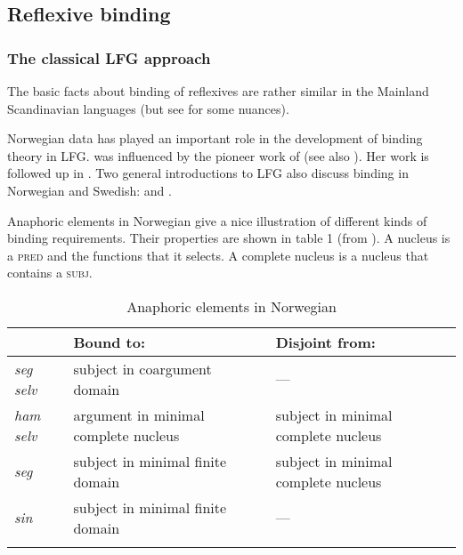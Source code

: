 \documentclass[output=paper,hidelinks]{langscibook}
\begin{document}
\ea\label{ex:Scandinavian:105}
\z


\ea\label{ex:Scandinavian:106}
 \z

 \subsection{Reflexive binding}
 \label{sec:Scandinavian:3.11}

\subsubsection{The classical LFG approach}

The basic facts about binding of reflexives are rather similar in the Mainland Scandinavian languages (but see \citealt{Lundquist14} for some nuances).

 Norwegian data has played an important role in the development of binding theory in LFG. \citet{dalrymple1993} was influenced by the pioneer work of \citet{Hellan88} (see also \citealt{Hestvik91}). Her work is followed up in \citet[227--85]{BresnanEtAl2016}. Two general introductions to LFG also discuss binding in Norwegian and Swedish: \citet[173--91]{falk2001lexical} and \citet[152--175]{BoNoSa19}.

 Anaphoric elements in Norwegian give a nice illustration of different kinds of binding requirements. Their properties are shown in table 1 (from \citealt[34]{dalrymple1993}). A nucleus is a \textsc{pred} and the functions that it selects. A complete nucleus is a nucleus that contains a \textsc{subj}.



\begin{table}
  \begin{tabularx}{\textwidth}{llQ}
    \lsptoprule
{}& Bound to:& Disjoint from:\\\midrule
\textit{seg} \textit{selv} & subject in coargument domain & ---\\
\textit{ham} \textit{selv} &argument in minimal complete nucleus &subject in minimal complete nucleus\\
\textit{seg}& subject in minimal finite domain& subject in minimal complete nucleus\\
\textit{sin}& subject in minimal finite domain & ---\\
\lspbottomrule
\end{tabularx}

\caption{Anaphoric elements in Norwegian}
\end{table}
\end{document}

